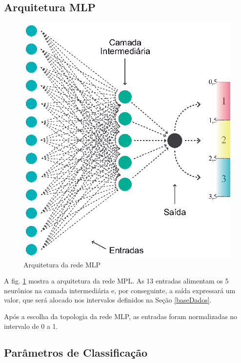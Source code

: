 \subsection{Arquitetura MLP}

\begin{figure}[H]

\centering %
\includegraphics{04-Figuras/Arquitetura-MPL}

\caption{Arquitetura da rede MLP}

\label{figura:arquiteturaMPL}

\end{figure}


A fig. \ref{figura:arquiteturaMPL} mostra a arquitetura da rede MPL. As 13 entradas alimentam os 5 neurônios na camada intermediária e, por conseguinte, a saída expressará um valor, que será alocado nos intervalos definidos na Seção \ref{baseDados}.

Após a escolha da topologia da rede MLP, as entradas foram normalizadas no intervalo de 0 a 1.


\subsection{Parâmetros de Classificação}


